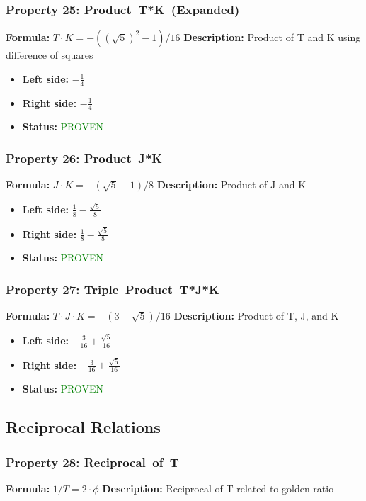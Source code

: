 \subsubsection*{Property 25: Product~T*K~(Expanded)}
\textbf{Formula:} $T \cdot K = -((\sqrt{5})^2-1)/16$
\textbf{Description:} Product of T and K using difference of squares

\begin{itemize}
\item \textbf{Left side:} $- \frac{1}{4}$
\item \textbf{Right side:} $- \frac{1}{4}$
\item \textbf{Status:} \textcolor{green}{PROVEN}
\end{itemize}

\subsubsection*{Property 26: Product~J*K}
\textbf{Formula:} $J  \cdot  K = -(\sqrt{5}-1)/8$
\textbf{Description:} Product of J and K

\begin{itemize}
\item \textbf{Left side:} $\frac{1}{8} - \frac{\sqrt{5}}{8}$
\item \textbf{Right side:} $\frac{1}{8} - \frac{\sqrt{5}}{8}$
\item \textbf{Status:} \textcolor{green}{PROVEN}
\end{itemize}

\subsubsection*{Property 27: Triple~Product~T*J*K}
\textbf{Formula:} $T \cdot J \cdot K = -(3-\sqrt{5})/16$
\textbf{Description:} Product of T, J, and K

\begin{itemize}
\item \textbf{Left side:} $- \frac{3}{16} + \frac{\sqrt{5}}{16}$
\item \textbf{Right side:} $- \frac{3}{16} + \frac{\sqrt{5}}{16}$
\item \textbf{Status:} \textcolor{green}{PROVEN}
\end{itemize}


\subsection{Reciprocal Relations}

\subsubsection*{Property 28: Reciprocal~of~T}
\textbf{Formula:} $1/T = 2 \cdot \phi$
\textbf{Description:} Reciprocal of T related to golden ratio

